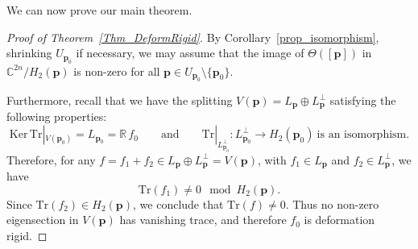 \documentclass[11pt]{amsart}
\newtheorem{theorem}{Theorem}[section]
\newcommand{\Ker}{\mathrm{Ker}}
\newcommand{\Z}{{\mathbb Z}}
\newcommand{\Tr}{\mathrm{Tr}}
\newcommand{\mbp}{\mathbf{p}}
\newcommand{\Span}{\mathrm{span}}
\begin{document}

We can now prove our main theorem.


\begin{proof}[Proof of Theorem~\ref{Thm_DeformRigid}]
  \label{Pf_MainThm}
	By Corollary~\ref{prop_isomorphism}, shrinking $U_{\mbp_0}$ if
	necessary, we may assume that the image of $\Theta([\mbp])$ in
	$\mathbb{C}^{2n}/H_2(\mbp)$ is non-zero for all
	$\mbp\in U_{\mbp_0}\setminus\{\mbp_0\}$. 
	
	
	Furthermore, recall that we have the splitting $V ({\mbp}) = L_{\mbp} \oplus L_{\mbp}^{\perp}$ satisfying the following properties:
	\[
	\Ker \,\Tr|_{V(\mbp_0)} = L_{\mbp_0}=\mathbb R\, f_0\qquad\text{and}\qquad
	\Tr|_{L_{\mbp_0}^\perp}\colon  L_{\mbp_0}^\perp\to H_2(\mbp_0)\ \text{is an isomorphism}.
	\]
	Therefore, for any
	$f=f_1+f_2\in L_{\mbp}\oplus L_{\mbp}^{\perp}=V({\mbp})$, with
	$f_1\in L_{\mbp}$ and $f_2\in L_{\mbp}^{\perp}$, we  have
	\[
	\Tr(f_1)\neq 0 \mod{H_2(\mbp)}.
	\]
	Since $\Tr(f_2)\in H_2(\mbp)$, we conclude that $\Tr(f)\neq 0$.
	Thus no non-zero eigensection in $V({\mbp})$ has vanishing trace, and
	therefore $f_0$ is deformation rigid.
\end{proof}



\end{document}
